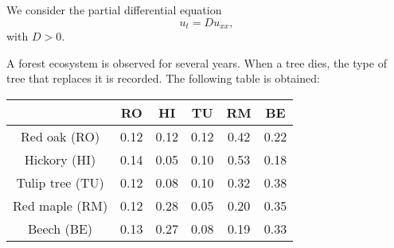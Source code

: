 \documentclass[12pt]{exam}
\def\IR{\mathbb{R}}
\begin{document}
\begin{questions}
\vskip1cm
\question[10]
We consider the partial differential equation
\begin{equation}\label{eq:diffusion}
u_t=Du_{xx},
\end{equation}
with $D>0$.

\vskip1cm
\question[15]
A forest ecosystem is observed for several years. When a tree dies, the type of
tree that replaces it is recorded. The following table is obtained:
\begin{center}
\begin{tabular}{c||c|c|c|c|c|}
& RO & HI & TU & RM & BE \\
\hline
Red oak (RO) & 0.12 & 0.12 & 0.12 & 0.42 & 0.22 \\
Hickory (HI) & 0.14 & 0.05 & 0.10 & 0.53 & 0.18 \\
Tulip tree (TU) & 0.12 & 0.08 & 0.10 & 0.32 & 0.38 \\
Red maple (RM) & 0.12 & 0.28 & 0.05 & 0.20 & 0.35 \\
Beech (BE) & 0.13 & 0.27 & 0.08 & 0.19 & 0.33
\end{tabular}
\end{center}


\end{questions}
\end{document}
